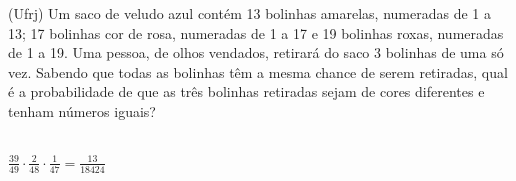 \begin{ex}
(Ufrj) Um saco de veludo azul contém 13 bolinhas amarelas, numeradas de 1 a 13; 17 bolinhas cor de rosa, numeradas de 1  a 17 e 19 bolinhas roxas, numeradas de 1 a 19.  Uma pessoa, de olhos vendados, retirará do saco 3 bolinhas de uma só vez. Sabendo que todas as bolinhas têm a mesma chance de serem retiradas, qual é a probabilidade de que as três bolinhas retiradas sejam de cores diferentes e tenham números iguais?
  \begin{sol}
   \phantom{A}\\
   $\frac{39}{49}\cdot\frac{2}{48}\cdot\frac{1}{47}=\frac{13}{18424}$
  \end{sol}
\end{ex}